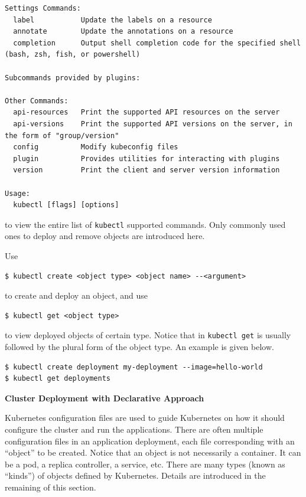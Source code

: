 \begin{lstlisting}
Settings Commands:
  label           Update the labels on a resource
  annotate        Update the annotations on a resource
  completion      Output shell completion code for the specified shell (bash, zsh, fish, or powershell)

Subcommands provided by plugins:

Other Commands:
  api-resources   Print the supported API resources on the server
  api-versions    Print the supported API versions on the server, in the form of "group/version"
  config          Modify kubeconfig files
  plugin          Provides utilities for interacting with plugins
  version         Print the client and server version information

Usage:
  kubectl [flags] [options]
\end{lstlisting}
to view the entire list of \verb|kubectl| supported commands. Only commonly used ones to deploy and remove objects are introduced here.

Use
\begin{lstlisting}
$ kubectl create <object type> <object name> --<argument>
\end{lstlisting}
to create and deploy an object, and use
\begin{lstlisting}
$ kubectl get <object type>
\end{lstlisting}
to view deployed objects of certain type. Notice that in \verb|kubectl get| is usually followed by the plural form of the object type. An example is given below.
\begin{lstlisting}
$ kubectl create deployment my-deployment --image=hello-world
$ kubectl get deployments
\end{lstlisting} 





\vspace{0.1in}
\noindent \textbf{Cluster Deployment with Declarative Approach}
\vspace{0.1in}

Kubernetes configuration files are used to guide Kubernetes on how it should configure the cluster and run the applications. There are often multiple configuration files in an application deployment, each file corresponding with an ``object'' to be created. Notice that an object is not necessarily a container. It can be a pod, a replica controller, a service, etc. There are many types (known as ``kinds'') of objects defined by Kubernetes. Details are introduced in the remaining of this section.

